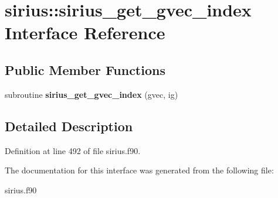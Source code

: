 \hypertarget{interfacesirius_1_1sirius__get__gvec__index}{}\section{sirius\+:\+:sirius\+\_\+get\+\_\+gvec\+\_\+index Interface Reference}
\label{interfacesirius_1_1sirius__get__gvec__index}
\subsection*{Public Member Functions}
\begin{DoxyCompactItemize}
\item 
\hypertarget{interfacesirius_1_1sirius__get__gvec__index_a6dcc1f38aff99abf49863b05a4ba166a}{}subroutine {\bfseries sirius\+\_\+get\+\_\+gvec\+\_\+index} (gvec, ig)\label{interfacesirius_1_1sirius__get__gvec__index_a6dcc1f38aff99abf49863b05a4ba166a}

\end{DoxyCompactItemize}


\subsection{Detailed Description}


Definition at line 492 of file sirius.\+f90.



The documentation for this interface was generated from the following file\+:\begin{DoxyCompactItemize}
\item 
sirius.\+f90\end{DoxyCompactItemize}
